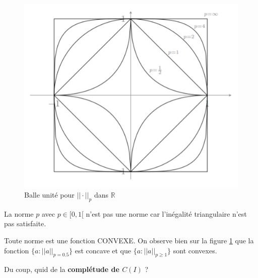 \begin{figure}[H]
    \centering
    \includegraphics[scale = .5]{unitball.png}
    \caption{Balle unité pour $||\cdot||_p$ dans $\mathbb{R}$}
    \label{fig:unitball}
\end{figure}

\begin{remark}
    La norme $p$ avec $p \in [0,1[$ n'est pas une norme car l'inégalité triangulaire n'est pas satisfaite.
\end{remark}

\begin{remark}
    Toute norme est une fonction CONVEXE. On observe bien sur la figure \ref{fig:unitball} que la fonction $\{a:||a||_{p=0.5}\}$ est concave et que $\{a:||a||_{p\geq1}\}$ sont convexes.
\end{remark}

\vspace{0.5cm}
Du coup, quid de la \textbf{complétude de $C(I)$} ?

